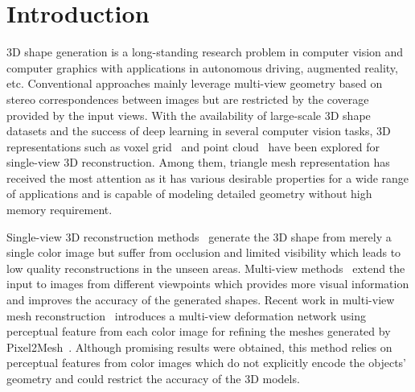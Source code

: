 \section{Introduction}

3D shape generation is a long-standing research problem in computer vision and computer graphics with applications in autonomous driving, augmented reality, etc. Conventional approaches mainly leverage multi-view geometry based on stereo correspondences between images but are restricted by the coverage provided by the input views. With the availability of large-scale 3D shape datasets and the success of deep learning in several computer vision tasks, 3D representations such as voxel grid~\cite{3dr2n2, tulsiani2017multi, yan2016perspective} and point cloud~\cite{yang2018foldingnet, fan2017point} have been explored for single-view 3D reconstruction.
Among them, triangle mesh representation has received the most attention as it has various desirable properties for a wide range of applications and is capable of modeling detailed geometry without high memory requirement.

Single-view 3D reconstruction methods~\cite{wang2018pixel2mesh,huang2015single,kar2015category,su2014estimating} generate the 3D shape from merely a single color image but suffer from occlusion and limited visibility which leads to low quality reconstructions in the unseen areas.
Multi-view methods~\cite{wen2019pixel2mesh++,3dr2n2,kar2017lsm,mcrecon2017} extend the input to images from different viewpoints which provides more visual information and improves the accuracy of the generated shapes.
Recent work in multi-view mesh reconstruction~\cite{wen2019pixel2mesh++} introduces a multi-view deformation network using perceptual feature from each color image for refining the meshes generated by Pixel2Mesh~\cite{wang2018pixel2mesh}.
Although promising results were obtained, this method relies on perceptual features from color images which do not explicitly encode the objects' geometry and could restrict the accuracy of the 3D models.

